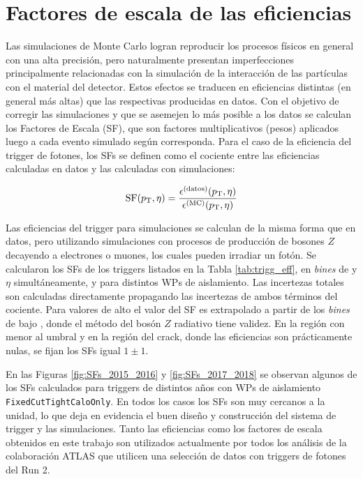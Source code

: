 \section{Factores de escala de las eficiencias}\label{sec:trig_sf}

Las simulaciones de Monte Carlo logran reproducir los procesos físicos en general con una alta precisión, pero naturalmente presentan imperfecciones principalmente relacionadas con la simulación de la interacción de las partículas con el material del detector. Estos efectos se traducen en eficiencias distintas (en general más altas) que las respectivas producidas en datos. Con el objetivo de corregir las simulaciones y que se asemejen lo más posible a los datos se calculan los Factores de Escala (SF), que son factores multiplicativos (pesos) aplicados luego a cada evento simulado según corresponda. Para el caso de la eficiencia del trigger de fotones, los SFs se definen como el cociente entre las eficiencias calculadas en datos y las calculadas con simulaciones:

\begin{equation}
	\text{SF}(p_{\text{T}}, \eta) = \frac{\epsilon^{\text{(datos)}}(p_{\text{T}}, \eta)}{\epsilon^{\text{(MC)}}(p_{\text{T}}, \eta)}
\end{equation}

Las eficiencias del trigger para simulaciones se calculan de la misma forma que en datos, pero utilizando simulaciones con procesos de producción de bosones $Z$ decayendo a electrones o muones, los cuales pueden irradiar un fotón. 
Se calcularon los SFs de los triggers listados en la Tabla \ref{tab:trigg_eff}, en \textit{bines} de \ET y $\eta$ simultáneamente, y para distintos WPs de aislamiento. Las incertezas totales son calculadas directamente propagando las incertezas de ambos términos del cociente. Para valores de alto \ET el valor del SF es extrapolado a partir de los \textit{bines} de bajo \ET, donde el método del bosón $Z$ radiativo tiene validez. En la región con \ET menor al umbral y en la región del crack, donde las eficiencias son prácticamente nulas, se fijan los SFs igual $1\pm1$. 

En las Figuras \ref{fig:SFs_2015_2016} y \ref{fig:SFs_2017_2018} se observan algunos de los SFs calculados para triggers de distintos años con WPs de aislamiento \texttt{FixedCutTightCaloOnly}. 
En todos los casos los SFs son muy cercanos a la unidad, lo que deja en evidencia el buen diseño y construcción del sistema de trigger y las simulaciones. Tanto las eficiencias como los factores de escala obtenidos en este trabajo son utilizados actualmente por todos los análisis de la colaboración ATLAS que utilicen una selección de datos con triggers de fotones del Run 2.

